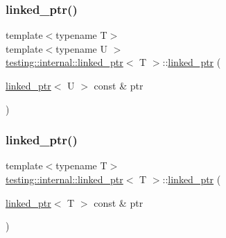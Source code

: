 \mbox{\label{classtesting_1_1internal_1_1linked__ptr_a7597ed91006edd0467c99bd1aaab07f5}} 
\subsubsection{\texorpdfstring{linked\_ptr()}{linked\_ptr()}\hspace{0.1cm}{\footnotesize\ttfamily [2/3]}}
{\footnotesize\ttfamily template$<$typename T$>$ \\
template$<$typename U $>$ \\
\mbox{\hyperlink{classtesting_1_1internal_1_1linked__ptr}{testing\+::internal\+::linked\+\_\+ptr}}$<$ T $>$\+::\mbox{\hyperlink{classtesting_1_1internal_1_1linked__ptr}{linked\+\_\+ptr}} (\begin{DoxyParamCaption}\item[{\mbox{\hyperlink{classtesting_1_1internal_1_1linked__ptr}{linked\+\_\+ptr}}$<$ U $>$ const \&}]{ptr }\end{DoxyParamCaption})\hspace{0.3cm}{\ttfamily [inline]}}

\mbox{\label{classtesting_1_1internal_1_1linked__ptr_abc076b5678cc7f64306d5ecfefc93aff}} 
\subsubsection{\texorpdfstring{linked\_ptr()}{linked\_ptr()}\hspace{0.1cm}{\footnotesize\ttfamily [3/3]}}
{\footnotesize\ttfamily template$<$typename T$>$ \\
\mbox{\hyperlink{classtesting_1_1internal_1_1linked__ptr}{testing\+::internal\+::linked\+\_\+ptr}}$<$ T $>$\+::\mbox{\hyperlink{classtesting_1_1internal_1_1linked__ptr}{linked\+\_\+ptr}} (\begin{DoxyParamCaption}\item[{\mbox{\hyperlink{classtesting_1_1internal_1_1linked__ptr}{linked\+\_\+ptr}}$<$ T $>$ const \&}]{ptr }\end{DoxyParamCaption})\hspace{0.3cm}{\ttfamily [inline]}}



